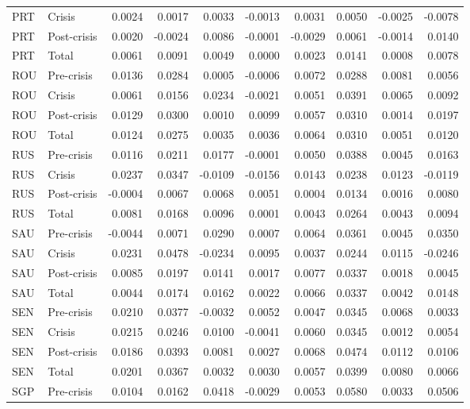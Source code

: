 \begin{longtable}[t]{llrrrrrrrr}
PRT & Crisis & 0.0024 & 0.0017 & 0.0033 & -0.0013 & 0.0031 & 0.0050 & -0.0025 & -0.0078\\
PRT & Post-crisis & 0.0020 & -0.0024 & 0.0086 & -0.0001 & -0.0029 & 0.0061 & -0.0014 & 0.0140\\
PRT & Total & 0.0061 & 0.0091 & 0.0049 & 0.0000 & 0.0023 & 0.0141 & 0.0008 & 0.0078\\
\addlinespace
ROU & Pre-crisis & 0.0136 & 0.0284 & 0.0005 & -0.0006 & 0.0072 & 0.0288 & 0.0081 & 0.0056\\
ROU & Crisis & 0.0061 & 0.0156 & 0.0234 & -0.0021 & 0.0051 & 0.0391 & 0.0065 & 0.0092\\
ROU & Post-crisis & 0.0129 & 0.0300 & 0.0010 & 0.0099 & 0.0057 & 0.0310 & 0.0014 & 0.0197\\
ROU & Total & 0.0124 & 0.0275 & 0.0035 & 0.0036 & 0.0064 & 0.0310 & 0.0051 & 0.0120\\
RUS & Pre-crisis & 0.0116 & 0.0211 & 0.0177 & -0.0001 & 0.0050 & 0.0388 & 0.0045 & 0.0163\\
\addlinespace
RUS & Crisis & 0.0237 & 0.0347 & -0.0109 & -0.0156 & 0.0143 & 0.0238 & 0.0123 & -0.0119\\
RUS & Post-crisis & -0.0004 & 0.0067 & 0.0068 & 0.0051 & 0.0004 & 0.0134 & 0.0016 & 0.0080\\
RUS & Total & 0.0081 & 0.0168 & 0.0096 & 0.0001 & 0.0043 & 0.0264 & 0.0043 & 0.0094\\
SAU & Pre-crisis & -0.0044 & 0.0071 & 0.0290 & 0.0007 & 0.0064 & 0.0361 & 0.0045 & 0.0350\\
SAU & Crisis & 0.0231 & 0.0478 & -0.0234 & 0.0095 & 0.0037 & 0.0244 & 0.0115 & -0.0246\\
\addlinespace
SAU & Post-crisis & 0.0085 & 0.0197 & 0.0141 & 0.0017 & 0.0077 & 0.0337 & 0.0018 & 0.0045\\
SAU & Total & 0.0044 & 0.0174 & 0.0162 & 0.0022 & 0.0066 & 0.0337 & 0.0042 & 0.0148\\
SEN & Pre-crisis & 0.0210 & 0.0377 & -0.0032 & 0.0052 & 0.0047 & 0.0345 & 0.0068 & 0.0033\\
SEN & Crisis & 0.0215 & 0.0246 & 0.0100 & -0.0041 & 0.0060 & 0.0345 & 0.0012 & 0.0054\\
SEN & Post-crisis & 0.0186 & 0.0393 & 0.0081 & 0.0027 & 0.0068 & 0.0474 & 0.0112 & 0.0106\\
\addlinespace
SEN & Total & 0.0201 & 0.0367 & 0.0032 & 0.0030 & 0.0057 & 0.0399 & 0.0080 & 0.0066\\
SGP & Pre-crisis & 0.0104 & 0.0162 & 0.0418 & -0.0029 & 0.0053 & 0.0580 & 0.0033 & 0.0506\\

\end{longtable}
